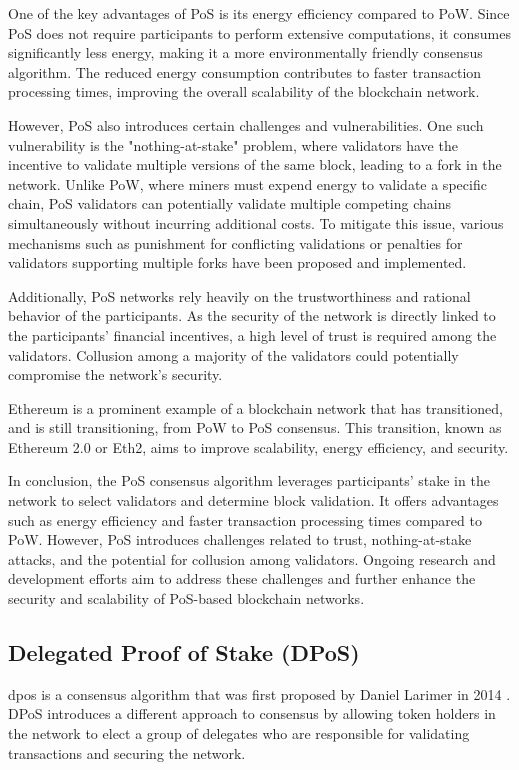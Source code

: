 One of the key advantages of PoS is its energy efficiency compared to PoW. Since PoS does not require participants to perform extensive computations, it consumes significantly less energy, making it a more environmentally friendly consensus algorithm. The reduced energy consumption contributes to faster transaction processing times, improving the overall scalability of the blockchain network.

However, PoS also introduces certain challenges and vulnerabilities. One such vulnerability is the "nothing-at-stake" problem, where validators have the incentive to validate multiple versions of the same block, leading to a fork in the network. Unlike PoW, where miners must expend energy to validate a specific chain, PoS validators can potentially validate multiple competing chains simultaneously without incurring additional costs. To mitigate this issue, various mechanisms such as punishment for conflicting validations or penalties for validators supporting multiple forks have been proposed and implemented.

Additionally, PoS networks rely heavily on the trustworthiness and rational behavior of the participants. As the security of the network is directly linked to the participants' financial incentives, a high level of trust is required among the validators. Collusion among a majority of the validators could potentially compromise the network's security.

Ethereum is a prominent example of a blockchain network that has transitioned, and is still transitioning, from PoW to PoS consensus. This transition, known as Ethereum 2.0 or Eth2, aims to improve scalability, energy efficiency, and security.

In conclusion, the PoS consensus algorithm leverages participants' stake in the network to select validators and determine block validation. It offers advantages such as energy efficiency and faster transaction processing times compared to PoW. However, PoS introduces challenges related to trust, nothing-at-stake attacks, and the potential for collusion among validators. Ongoing research and development efforts aim to address these challenges and further enhance the security and scalability of PoS-based blockchain networks.

\subsection{Delegated Proof of Stake (DPoS)}

\gls{dpos} is a consensus algorithm that was first proposed by Daniel Larimer in 2014 \cite{larimer2014delegated}. DPoS introduces a different approach to consensus by allowing token holders in the network to elect a group of delegates who are responsible for validating transactions and securing the network.

